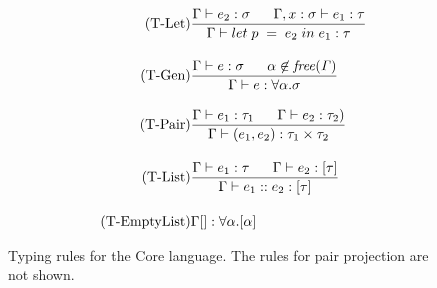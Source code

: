 \begin{figure}[htb]
\begin{align*}
\tag{T-Let}
&\frac{\Gamma \vdash e_{2}:\sigma \;\;\;\;\;\; \Gamma, x:\sigma \vdash e_{1}:\tau}
{\Gamma \vdash let\;p\;=\;e_{2}\;in\;e_{1}:\tau}
\\[1em]
\tag{T-Gen}
&\frac{\Gamma \vdash e:\sigma \;\;\;\;\;\; \alpha \not\in \mathit{free(\Gamma)}}{\Gamma \vdash e : \forall \alpha . \sigma}
\\[1em]
\tag{T-Pair}
&\frac
{\Gamma \vdash e_{1}:\tau_{1} \;\;\;\;\;\; \Gamma \vdash e_{2}:\tau_{2})}
{\Gamma \vdash (e_{1},e_{2}):\tau_{1} \times \tau_{2}}
\\[1em]
\tag{T-List}
&\frac
{\Gamma \vdash e_{1}:\tau \;\;\;\;\;\; \Gamma \vdash e_{2}:[\tau]}
{\Gamma \vdash e_{1}::e_{2}:[\tau]}
\\[1em]
\tag{T-EmptyList}
&\Gamma [] : \forall \alpha.[\alpha]
\end{align*}
\caption{Typing rules for the Core language. The rules for pair projection are not shown. \label{fig:TypeRulesCore}}
\end{figure}

